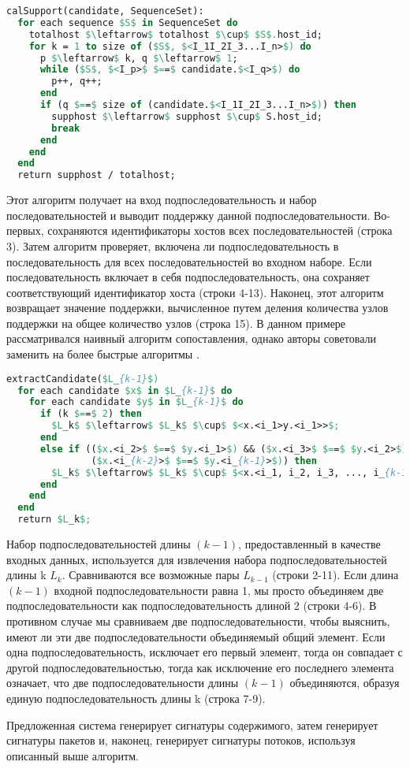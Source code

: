 \begin{lstlisting}[language=Pascal, caption=Алгоритм вычисления поддержки, mathescape]
calSupport(candidate, SequenceSet):
  for each sequence $S$ in SequenceSet do
    totalhost $\leftarrow$ totalhost $\cup$ $S$.host_id;
    for k = 1 to size of ($S$, $<I_1I_2I_3...I_n>$) do
      p $\leftarrow$ k, q $\leftarrow$ 1;
      while ($S$, $<I_p>$ $==$ candidate.$<I_q>$) do
        p++, q++;
      end
      if (q $==$ size of (candidate.$<I_1I_2I_3...I_n>$)) then
        supphost $\leftarrow$ supphost $\cup$ S.host_id;
        break
      end
    end
  end
  return supphost / totalhost;
\end{lstlisting}

Этот алгоритм получает на вход подпоследовательность и набор последовательностей и выводит поддержку данной подпоследовательности.
Во-первых, сохраняются идентификаторы хостов всех последовательностей (строка 3).
Затем алгоритм проверяет, включена ли подпоследовательность в последовательность для всех последовательностей во входном наборе.
Если последовательность включает в себя подпоследовательность, она сохраняет соответствующий идентификатор хоста (строки 4-13).
Наконец, этот алгоритм возвращает значение поддержки, вычисленное путем деления количества узлов поддержки на общее количество узлов (строка 15).
В данном примере рассматривался наивный алгоритм сопоставления, однако авторы советовали заменить на более быстрые алгоритмы
\cite{karp1987efficient,boyer1977fast,xie2010improved,zhou2019research}.

\begin{lstlisting}[language=Pascal, caption=Алгоритм извлечения кандидата, mathescape]
extractCandidate($L_{k-1}$)
  for each candidate $x$ in $L_{k-1}$ do
    for each candidate $y$ in $L_{k-1}$ do
      if (k $==$ 2) then
        $L_k$ $\leftarrow$ $L_k$ $\cup$ $<x.<i_1>y.<i_1>>$;
      end
      else if (($x.<i_2>$ $==$ $y.<i_1>$) && ($x.<i_3>$ $==$ $y.<i_2>$) && ...
               ($x.<i_{k-2}>$ $==$ $y.<i_{k-1}>$)) then
        $L_k$ $\leftarrow$ $L_k$ $\cup$ $<x.<i_1, i_2, i_3, ..., i_{k-1}>y.<i_{k-1}>$;
      end
    end
  end
  return $L_k$;
\end{lstlisting}

Набор подпоследовательностей длины $(k-1)$, предоставленный в качестве входных данных, используется для извлечения набора подпоследовательностей длины k $L_k$.
Сравниваются все возможные пары $L_{k-1}$ (строки 2-11).
Если длина $(k-1)$ входной подпоследовательности равна 1, мы просто объединяем две подпоследовательности как подпоследовательность длиной 2 (строки 4-6).
В противном случае мы сравниваем две подпоследовательности, чтобы выяснить, имеют ли эти две подпоследовательности объединяемый общий элемент.
Если одна подпоследовательность, исключает его первый элемент, тогда он совпадает с другой подпоследовательностью,
тогда как исключение его последнего элемента означает, что две подпоследовательности длины $(k-1)$ объединяются, образуя единую подпоследовательность длины k (строка 7-9).

Предложенная система генерирует сигнатуры содержимого, затем генерирует сигнатуры пакетов и, наконец, генерирует сигнатуры потоков, используя описанный выше алгоритм.


\newpage
